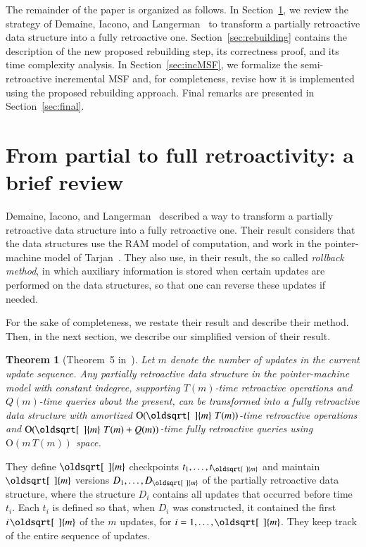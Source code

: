 \documentclass[3p,times,procedia]{elsarticle}
\renewcommand{\sqrt}[2][\mkern8mu]{\mkern-1mu\mathop{\oldsqrt[#1]{#2}}}
\newcommand{\Oh}{\mathrm{O}}
\newtheorem{theorem}              {Theorem}[section]
\begin{document}
The remainder of the paper is organized as follows. 
In Section~\ref{sec:review}, we review the strategy of Demaine, Iacono, and 
Langerman~\cite{DemaineIL2007} to transform a partially retroactive data structure 
into a fully retroactive one.
Section~\ref{sec:rebuilding} contains the description of the new proposed rebuilding step, 
its correctness proof, and its time complexity analysis. 
In Section~\ref{sec:incMSF}, we formalize the semi-retroactive incremental MSF
and, for completeness, revise how it is implemented using the proposed rebuilding approach. 
Final remarks are presented in Section~\ref{sec:final}.

\section{From partial to full retroactivity: a brief review}\label{sec:review}

Demaine, Iacono, and Langerman~\cite{DemaineIL2007} described a way to transform 
a partially retroactive data structure into a fully retroactive one.
Their result considers that the data structures use the RAM model of computation, 
and work in the pointer-machine model of Tarjan~\cite{Tarjan1979}.
They also use, in their result, the so called \emph{rollback method}, in which 
auxiliary information is stored when certain updates are performed on the data
structures, so that one can reverse these updates if needed.

For the sake of completeness, we restate their result and describe their method. 
Then, in the next section, we describe our simplified version of their result. 

\begin{theorem}[Theorem~5 in~\cite{DemaineIL2007}]
  Let $m$ denote the number of updates in the current update sequence. 
  Any partially retroactive data structure in the pointer-machine model with 
  constant indegree, supporting $T(m)$-time retroactive operations and $Q(m)$-time
  queries about the present, can be transformed into a fully retroactive data
  structure with amortized $\Oh(\sqrt{m}\,T(m))$-time retroactive operations and 
  $\Oh(\sqrt{m}\,T(m)+Q(m))$-time fully retroactive queries using $\Oh(m\,T(m))$ space.
\end{theorem}

They define $\sqrt{m}$ checkpoints $t_1,\ldots,t_{\sqrt{m}}$ and maintain $\sqrt{m}$ 
versions $D_1,\ldots,D_{\sqrt{m}}$ of the partially retroactive data structure, 
where the structure $D_i$ contains all updates that occurred before time $t_i$.
Each $t_i$ is defined so that, when $D_i$ was constructed, it contained 
the first $i\sqrt{m}$ of the $m$ updates, for $i=1,\ldots,\sqrt{m}$. 
They keep track of the entire sequence of updates.
\end{document}
